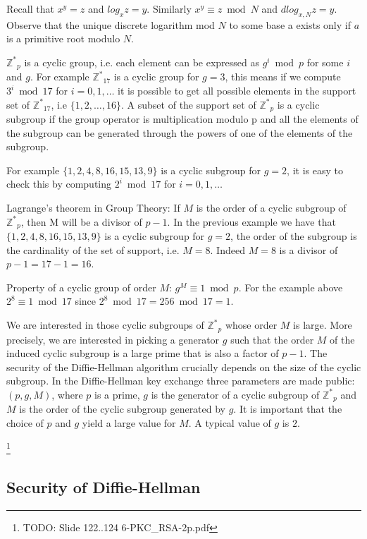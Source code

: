 Recall that $x^y = z$ and $log_x z = y$. Similarly $x^y \equiv z \bmod N$ and $dlog_{x,N} z = y$. Observe that the unique discrete logarithm mod $N$ to some base a exists only if $a$ is a primitive root modulo $N$.

$\mathbb{Z^*}_p$ is a cyclic group, i.e. each element can be expressed as $g^i \bmod p$ for some $i$ and $g$. For example $\mathbb{Z^*}_{17}$ is a cyclic group for $g=3$, this means if we compute $3^i \bmod 17$ for $i=0,1,\ldots$ it is possible to get all possible elements in the support set of $\mathbb{Z^*}_{17}$, i.e $\{1,2,\ldots,16\}$. A subset of the support set of $\mathbb{Z^*}_p$ is a cyclic subgroup if the group operator is multiplication modulo p and all the elements of the subgroup can be generated through the powers of one of the elements of the subgroup.

For example $\{1, 2, 4, 8, 16, 15, 13, 9\}$ is a cyclic subgroup for $g=2$, it is easy to check this by computing $2^i \bmod 17$ for $i=0,1,\ldots$

Lagrange’s theorem in Group Theory: If $M$ is the order of a cyclic subgroup of $\mathbb{Z^*}_p$, then M will be a divisor of $p-1$. In the previous example we have that $\{1, 2, 4, 8, 16, 15, 13, 9\}$ is a cyclic subgroup for $g=2$, the order of the  subgroup is the cardinality of the set of support, i.e. $M=8$. Indeed $M=8$ is a divisor of $p-1=17-1=16$.

Property of a cyclic group of order $M$: $g^M \equiv 1 \bmod p$. For the example above $2^8 \equiv 1 \bmod 17$ since $2^8 \bmod 17  = 256 \bmod 17 = 1$.

We are interested in those cyclic subgroups of $\mathbb{Z^*}_p$ whose order $M$ is large.  More precisely, we are interested in picking a generator $g$ such that the order $M$ of the induced cyclic subgroup is a large prime that is also a factor of $p-1$. The security of the Diffie-Hellman algorithm crucially depends on the size of the cyclic subgroup. In the Diffie-Hellman key exchange three parameters are made public: $(p,g,M)$, where $p$ is a prime, $g$ is the generator of a cyclic subgroup of $\mathbb{Z^*}_p$ and $M$ is the order of the cyclic subgroup generated by $g$. It is important that the choice of $p$ and $g$ yield a large value for $M$. A typical value of $g$ is $2$.

\footnote{TODO: Slide 122..124 6-PKC\_RSA-2p.pdf}

\subsection{Security of Diffie-Hellman}

